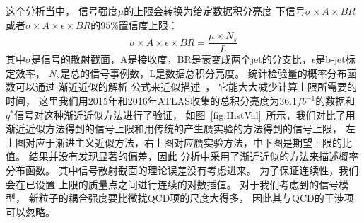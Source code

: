 这个分析当中，
信号强度$\mu$的上限会转换为给定数据积分亮度
下信号$\sigma\times A \times BR$或者$\sigma\times A \times \epsilon \times BR$的$95\%$置信度上限：
\begin{equation} 
\label{eq:Limit8}
\sigma\times A \times \epsilon \times BR =\frac{\mu\times N_s}{L}
\end{equation}
其中$\sigma$是信号的散射截面，A是接收度，BR是衰变成两个jet的分支比，$\epsilon$是b-jet标定效率，
$N_s$是总的信号事例数，L是数据总积分亮度。
统计检验量的概率分布函数可以通过
渐近近似的解析
公式来近似描述~\cite{Cowan:2010js}，
它能大大减少计算上限所需要的时间，
这里我们用2015年和2016年ATLAS收集的总积分亮度为36.1$fb^{-1}$的数据和$q^*$信号对这种渐近近似方法进行了验证，
如图~\ref{fig:HistVal}~所示，我们对比了用渐近近似方法得到的信号上限和用传统的产生赝实验的方法得到的信号上限，
左上图对应于渐进主义近似方法，右上图对应赝实验方法，中下图是期望上限的比值。
结果并没有发现显著的偏差，因此
分析中采用了渐近近似的方法来描述概率分布函数。
其中信号散射截面的理论误差没有考虑进来。
为了保证连续性，我们会在已设置
上限的质量点之间进行连续的对数插值。
对于我们考虑到的信号模型，%
新粒子的耦合强度要比微扰QCD项的尺度大得多，
因此其与QCD的干涉项可以忽略。

